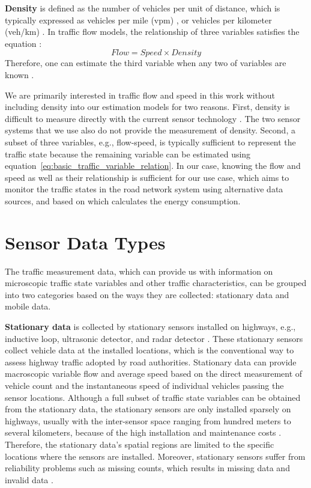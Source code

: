 \documentclass[english]{kththesis}
\begin{document}
\textbf{Density} is defined as the number of vehicles per unit of distance, which is typically expressed as vehicles per mile (vpm) \cite{elefteriadou_traffic_flow_theory}, or vehicles per kilometer (veh/km) \cite{seo_tse}. In traffic flow models, the relationship of three variables satisfies the equation \cite{seo_tse, elefteriadou_traffic_flow_theory}:
\begin{equation}
    Flow = Speed \times Density
    \label{eq:basic_traffic_variable_relation}
\end{equation}
Therefore, one can estimate the third variable when any two of variables are known \cite{elefteriadou_traffic_flow_theory}.

We are primarily interested in traffic flow and speed in this work without including density into our estimation models for two reasons. First, density is difficult to measure directly with the current sensor technology \cite{elefteriadou_traffic_flow_theory}. The two sensor systems that we use also do not provide the measurement of density. Second, a subset of three variables, e.g., flow-speed, is typically sufficient to represent the traffic state because the remaining variable can be estimated using equation~\ref{eq:basic_traffic_variable_relation}. In our case, knowing the flow and speed as well as their relationship is sufficient for our use case, which aims to monitor the traffic states in the road network system using alternative data sources, and based on which calculates the energy consumption.


\section{Sensor Data Types}
\label{sec:dataTypes}
The traffic measurement data, which can provide us with information on microscopic traffic state variables and other traffic characteristics, can be grouped into two categories based on the ways they are collected:  stationary data and mobile data.

\textbf{Stationary data} is collected by stationary sensors installed on highways, e.g., inductive loop, ultrasonic detector, and radar detector \cite{seo_tse}. These stationary sensors collect vehicle data at the installed locations, which is the conventional way to assess highway traffic adopted by road authorities. Stationary data can provide macroscopic variable flow and average speed based on the direct measurement of vehicle count and the instantaneous speed of individual vehicles passing the sensor locations. Although a full subset of traffic state variables can be obtained from the stationary data, the stationary sensors are only installed sparsely on highways, usually with the inter-sensor space ranging from hundred meters to several kilometers, because of the high installation and maintenance costs \cite{seo_tse}. Therefore, the stationary data's spatial regions are limited to the specific locations where the sensors are installed. Moreover, stationary sensors suffer from reliability problems such as missing counts, which results in missing data and invalid data \cite{duan_dl_imputation, chen_imputation_regression}.
\end{document}

